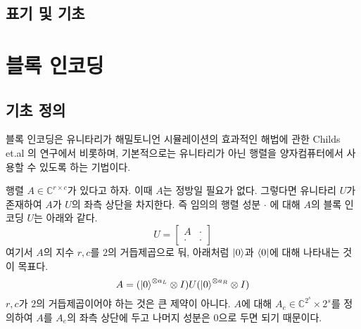 \documentclass[hidelinks,article,a4paper,chapter,twocolumn]{oblivoir}
\begin{document}
\section{표기 및 기초}
\chapter{블록 인코딩}
\section{기초 정의}
블록 인코딩은 유니타리가 해밀토니언 시뮬레이션의 효과적인 해법에 관한
Childs et.al \cite{Childs2017}의 연구에서 비롯하며, 기본적으로는 유니타리가
아닌 행렬을 양자컴퓨터에서 사용할 수 있도록 하는 기법이다. 

행렬 $A\in\mathbb{C}^{r\times c}$가 있다고 하자. 이때 $A$는 정방일 필요가
없다. 그렇다면 유니타리 $U$가 존재하여 $A$가 $U$의 좌측 상단을 차지한다. 즉
임의의 행렬 성분 $\cdot$ 에 대해 $A$의 블록 인코딩 $U$는 아래와 같다.
\begin{equation}
  U = \begin{bmatrix}A&\cdot\\\cdot&\cdot\end{bmatrix}
\end{equation}
여기서 $A$의 지수 $r,c$를 $2$의 거듭제곱으로 둬, 아래처럼 $\ket0$과 $\bra0$에
대해 나타내는 것이 목표다. 
\begin{equation}
  A = (\ket0^{\otimes a_L}\otimes I)U(\ket0^{\otimes a_R}\otimes I)
\end{equation}
$r,c$가 $2$의 거듭제곱이어야 하는 것은 큰 제약이 아니다. $A$에 대해 $A_e\in
\mathbb{C}^{2^s}\times{2^s}$를 정의하여 $A$를 $A_e$의 좌측 상단에 두고 나머지
성분은 $0$으로 두면 되기 때문이다. 
\end{document}
